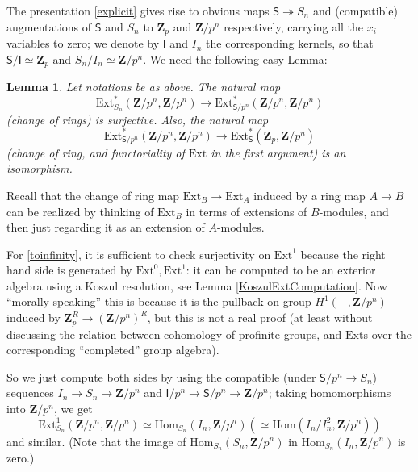 \documentclass[10pt]{amsart}
\newif\iflongproof
\newcommand{\Z}{\mathbf{Z}}
\newcommand{\Ext}{\mathrm{Ext}}
\newcommand{\Hom}{\mathrm{Hom}}
\newcommand{\Sinf}{\mathsf{S}}
\newcommand{\Iinf}{\mathsf{I}}
\newtheorem*{lemma*}{Lemma}
\theoremstyle{remark}
\begin{document}
 
The presentation \eqref{explicit} gives rise to obvious maps
 $ \Sinf \twoheadrightarrow S_n$ and  (compatible) augmentations of $\Sinf$ and $S_n$ to $\Z_p$ and $\Z/p^n$ respectively, carrying all the $x_i$ variables to zero; we denote by $\Iinf$ and $I_n$ the corresponding kernels,
so that $\Sinf/\Iinf \simeq \Z_p$ and $S_n/I_n \simeq \Z/p^n$. 
We need the following easy Lemma:
 \begin{lemma*}
Let notations be as above. The natural map
\begin{equation} \label{toinfinity} \Ext^*_{S_n }(\Z/p^n, \Z/p^n) \rightarrow \Ext^*_{\Sinf/p^n}(\Z/p^n, \Z/p^n) \end{equation}
(change of rings) is {\em surjective}. Also,  the natural map
\begin{equation} \label{corfunct} \Ext^*_{\Sinf/p^n}(\Z/p^n, \Z/p^n) \rightarrow \Ext^*_{\Sinf}(\Z_p, \Z/p^n)\end{equation} 
 (change of ring, and functoriality of $\Ext$ in the first argument) is an isomorphism. 
 
\end{lemma*}

 Recall that the change of ring map  $\Ext_B \rightarrow \Ext_A$ induced by a ring map $A \rightarrow B$  can be realized by thinking of $\Ext_B$ in terms of extensions of $B$-modules, and then
 just regarding it as an extension of $A$-modules.  
 
\proof 
\iflongproof
For \eqref{toinfinity}, it is sufficient to check surjectivity on  $\Ext^1$ because the right hand side
is generated by $\Ext^0, \Ext^1$: it can be computed  to be an exterior algebra using a Koszul resolution, see Lemma \ref{KoszulExtComputation}.
  Now ``morally speaking''  this is because it is the pullback on  group $H^1(-, \Z/p^n)$ induced
by $\Z_p^R \rightarrow (\Z/p^n)^R$, but  this is not a real proof  (at least without discussing the relation between cohomology of profinite groups, 
and $\Ext$s over the corresponding ``completed'' group algebra).


 
So we just compute both sides by using the  compatible (under $\Sinf/p^n \rightarrow S_n$) sequences
$I_n \rightarrow S_n \rightarrow \Z/p^n$ and $\Iinf/p^n \rightarrow \Sinf/p^n \rightarrow \Z/p^n$;
taking homomorphisms into $\Z/p^n$, we get 
\begin{equation} \label{coocoo} \Ext^1_{S_n}(\Z/p^n, \Z/p^n) \simeq \Hom_{S_n}(I_n, \Z/p^n) \left( \simeq \Hom(I_n/I_n^2, \Z/p^n) \right) \end{equation}
and similar.    (Note that the image of $\Hom_{S_n}(S_n, \Z/p^n)$ in $\Hom_{S_n}(I_n, \Z/p^n)$ is zero.) 
\end{document}

